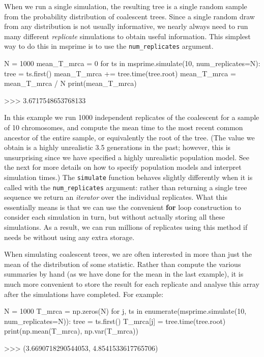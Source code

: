 \documentclass[graybox]{svmult}
\begin{document}
When we run a single simulation, the resulting tree is a single random
sample from the probability distribution of coalescent trees. Since a
single random draw from any distribution is not usually informative, we
nearly always need to run many different \emph{replicate} simulations to
obtain useful information. This simplest way to do this in msprime is to
use the \texttt{num\_replicates} argument.

\begin{pythoncode}
N = 1000
mean_T_mrca = 0
for ts in msprime.simulate(10, num_replicates=N):
    tree = ts.first()
    mean_T_mrca += tree.time(tree.root)
mean_T_mrca = mean_T_mrca / N
print(mean_T_mrca)

>>> 3.6717548653768133
\end{pythoncode}

    In this example we run 1000 independent replicates of the coalescent for
a sample of 10 chromosomes, and compute the mean time to the most recent
common ancestor of the entire sample, or equivalently the root of the
tree. (The value we obtain is a highly unrealistic 3.5 generations in
the past; however, this is unsurprising since we have specified a highly
unrealistic population model. See the next for more details on how to
specify population models and interpret simulation times.) The
\texttt{simulate} function behaves slightly differently when it is
called with the \texttt{num\_replicates} argument: rather than returning
a single tree sequence we return an \emph{iterator} over the individual
replicates. What this essentially means is that we can use the
convenient \textbf{for} loop construction to consider each simulation in
turn, but without actually storing all these simulations. As a result,
we can run millions of replicates using this method if needs be without
using any extra storage.

When simulating coalescent trees, we are often interested in more than
just the mean of the distribution of some statistic. Rather than compute
the various summaries by hand (as we have done for the mean in the last
example), it is much more convenient to store the result for each
replicate and analyse this array after the simulations have completed.
For example:

\begin{pythoncode}
N = 1000
T_mrca = np.zeros(N)
for j, ts in enumerate(msprime.simulate(10, num_replicates=N)):
    tree = ts.first()
    T_mrca[j] = tree.time(tree.root)
print(np.mean(T_mrca), np.var(T_mrca))

>>> (3.6690718290544053, 4.8541533617765706)
\end{pythoncode}
\end{document}
